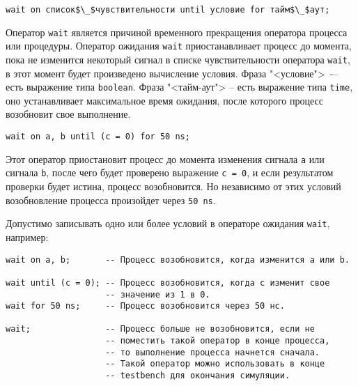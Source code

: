 \begin{Code}
\begin{lstlisting}[mathescape]
wait on список$\_$чувствительности until условие for тайм$\_$аут;
\end{lstlisting}
\end{Code}

Оператор \lstinline?wait? является причиной временного прекращения оператора процесса или процедуры. Оператор ожидания \lstinline?wait? приостанавливает процесс до момента, пока не изменится некоторый сигнал в списке чувствительности оператора \lstinline?wait?, в этот момент будет произведено вычисление условия. Фраза "<условие">~-– есть выражение типа \lstinline?boolean?. Фраза "<тайм-аут"> – есть выражение типа \lstinline?time?, оно устанавливает максимальное время ожидания, после которого процесс возобновит свое выполнение.


\begin{Code}
\begin{lstlisting}
wait on a, b until (c = 0) for 50 ns;
\end{lstlisting}
\end{Code}

Этот оператор приостановит процесс до момента изменения сигнала \lstinline?a? или сигнала \lstinline?b?, после чего будет проверено выражение \lstinline?c = 0?, и если результатом проверки будет истина, процесс возобновится. Но независимо от этих условий возобновление процесса произойдет через \lstinline?50 ns?.

Допустимо записывать одно или более условий в операторе ожидания \lstinline?wait?, например:

\begin{Code}
\begin{lstlisting}
wait on a, b;       -- Процесс возобновится, когда изменится a или b.

wait until (c = 0); -- Процесс возобновится, когда c изменит свое 
                    -- значение из 1 в 0.
wait for 50 ns;     -- Процесс возобновится через 50 нс.

wait;               -- Процесс больше не возобновится, если не 
                    -- поместить такой оператор в конце процесса, 
                    -- то выполнение процесса начнется сначала. 
                    -- Такой оператор можно использовать в конце 
                    -- testbench для окончания симуляции.
\end{lstlisting}
\end{Code}

